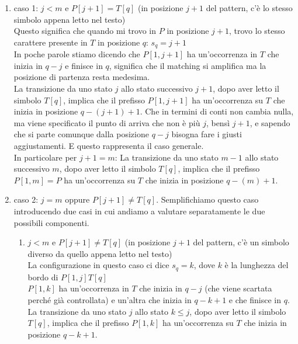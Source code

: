 \begin{enumerate}
    \item caso 1: $j<m$ e $P[j+1] = T[q]$	(in posizione $j+1$ del pattern, c’è lo stesso simbolo appena letto nel testo)\\
    Questo significa che quando mi trovo in $P$ in posizione $j+1$, trovo lo stesso carattere presente in $T$ in posizione $q$: $s_q = j+1$		\\
    In poche parole stiamo dicendo che $P[1, j+1]$ ha un’occorrenza in $T$ che inizia in $q-j$ e finisce in $q$, significa che il matching si amplifica ma la posizione di partenza resta medesima. \\
    
    La transizione da uno stato $j$ allo stato successivo $j+1$, dopo aver letto il simbolo $T[q]$, implica che il prefisso $P[1,j+1]$ ha un’occorrenza su $T$ che inizia in posizione $q-(j+1)+1$. Che in termini di conti non cambia nulla, ma viene specificato il punto di arriva che non è più $j$, bensì $j+1$, e sapendo che si parte comunque dalla posizione $q-j$ bisogna fare i giusti aggiustamenti. E questo rappresenta il caso generale.\\
    
    
    In particolare per $j+1= m$:
    La transizione da uno stato $m-1$ allo stato successivo $m$, dopo aver letto il simbolo $T[q]$, implica che il prefisso $P[1,m] = P$ ha un’occorrenza su $T$ che inizia in posizione $q-(m)+1$.
    \item caso 2: $j=m$ oppure $P[j+1] \neq T[q]$. Semplifichiamo questo caso introducendo due casi in cui andiamo a valutare separatamente le due possibili componenti.
    
    \begin{enumerate}
        \item $j < m$ e $P[j+1] \neq T[q]$	(in posizione $j+1$ del pattern, c’è un simbolo diverso da quello appena letto nel testo)\\
        La configurazione in questo caso ci dice $s_q = k$, dove $k$ è la lunghezza del bordo di $P[1,j]T[q]$\\		
        $P[1,k]$ ha un’occorrenza in $T$ che inizia in $q-j$ (che viene scartata perché già controllata) e un’altra che inizia in $q-k+1$ e che finisce in $q$.\\
        La transizione da uno stato $j$ allo stato $k \leq j$, dopo aver letto il simbolo $T[q]$, implica che il prefisso $P[1,k]$ ha un’occorrenza su $T$ che inizia in posizione $q-k+1$.
        

\end{enumerate}
\end{enumerate}
